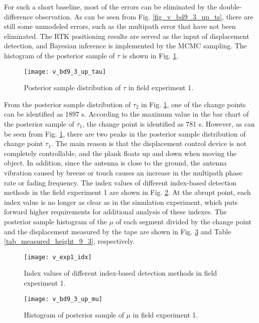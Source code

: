 \documentclass[final,3p,times]{elsarticle}
\begin{document}
	For such a short baseline, most of the errors can be eliminated by the double-difference observation. 
	As can be seen from Fig. \ref{fig_v_bd9_3_up_ts}, there are still some unmodeled errors, such as the multipath error that have not been eliminated. 
	\textcolor{r_s}{The RTK positioning results are served as the input of displacement detection}, and Bayesian inference is implemented by the MCMC sampling. 
	The histogram of the posterior sample of $\tau$ is shown in Fig. \ref{fig_v_bd9_3_up_tau}.
	\begin{figure}[htbp]
		\centering
		\texttt{[image: v\_bd9\_3\_up\_tau]}
		\caption{Posterior sample distribution of $\tau$ in field experiment 1.}
		\label{fig_v_bd9_3_up_tau}
	\end{figure} 
	From the posterior sample distribution of $\tau_2$ in Fig. \ref{fig_v_bd9_3_up_tau}, one of the change points can be identified as 1897 s. 
	According to the maximum value in the bar chart of the posterior sample of $\tau_1$, the change point is identified as 781 s.
	However, as can be seen from Fig. \ref{fig_v_bd9_3_up_tau}, there are two peaks in the posterior sample distribution of change point $\tau_1$.
	The main reason is that the displacement control device is not completely controllable, and the plank floats up and down when moving the object. 
	In addition, since the antenna is close to the ground, the antenna vibration caused by breeze or touch causes an increase in the multipath phase rate or fading frequency\cite{kelly2003characterization}. 
	The index values of different index-based detection methods in \textcolor{r_s}{the} field experiment 1 are shown in Fig. \ref{fig_v_exp1_idx}. At the abrupt point, each index value is no longer as clear as in the simulation experiment, which puts forward higher requirements for additional analysis of these indexes.
	The posterior sample histogram of the $\mu$ of each segment divided by the change point and the displacement measured by the tape are shown in Fig. \ref{fig_v_bd9_3_up_mu} and Table \ref{tab_measured_height_9_3}, respectively.
	\begin{figure}[htbp]
		\centering
		\texttt{[image: v\_exp1\_idx]}
		\caption{Index values of different index-based detection methods in field experiment 1.}
		\label{fig_v_exp1_idx}
	\end{figure} 
	\begin{figure}[htbp]
		\centering
		\texttt{[image: v\_bd9\_3\_up\_mu]}
		\caption{Histogram of posterior sample of $\mu$ in field experiment 1.}
		\label{fig_v_bd9_3_up_mu}
	\end{figure} 
\end{document}
